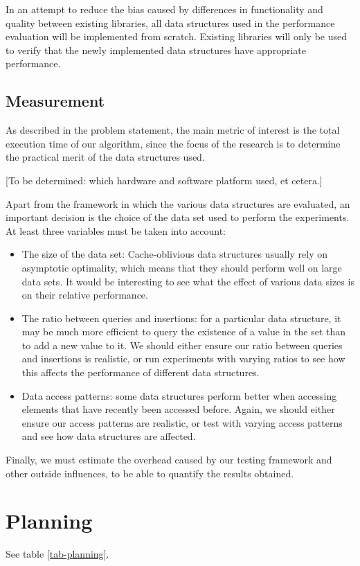 \documentclass{acm_proc_article-sp}
\begin{document}
In an attempt to reduce the bias caused by differences in functionality and quality between existing libraries, all data structures used in the performance evaluation will be implemented from scratch. Existing libraries will only be used to verify that the newly implemented data structures have appropriate performance.

\subsection{Measurement}
As described in the problem statement, the main metric of interest is the total execution time of our algorithm, since the focus of the research is to determine the practical merit of the data structures used.

[To be determined: which hardware and software platform used, et cetera.]

Apart from the framework in which the various data structures are evaluated, an important decision is the choice of the data set used to perform the experiments. At least three variables must be taken into account:
\begin{itemize}
\item The size of the data set: Cache-oblivious data structures usually rely on asymptotic optimality, which means that they should perform well on large data sets. It would be interesting to see what the effect of various data sizes is on their relative performance.
\item The ratio between queries and insertions: for a particular data structure, it may be much more efficient to query the existence of a value in the set than to add a new value to it. We should either ensure our ratio between queries and insertions is realistic, or run experiments with varying ratios to see how this affects the performance of different data structures.
\item Data access patterns: some data structures perform better when accessing elements that have recently been accessed before. Again, we should either ensure our access patterns are realistic, or test with varying access patterns and see how data structures are affected.
\end{itemize}

Finally, we must estimate the overhead caused by our testing framework and other outside influences, to be able to quantify the results obtained.

\section{Planning}
See table \ref{tab-planning}.
\end{document}

